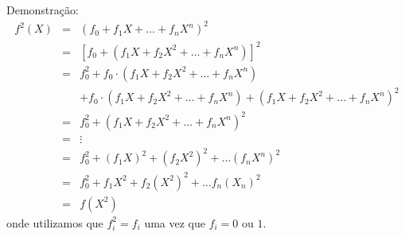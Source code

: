 \begin{frame}[allowframebreaks]
   Demonstração:
   \begin{eqnarray}
     f^2(X) &=& (f_0 + f_1 X + \ldots + f_n X^n)^2 \nonumber\\
            &=& [f_0 + (f_1 X + f_2 X^2 + \ldots + f_n X^n)]^2 \nonumber\\
            &=& f^2_0 + f_0 \cdot (f_1 X + f_2 X^2 + \ldots + f_n X^n) \nonumber\\
             && + f_0 \cdot (f_1 X + f_2 X^2 + \ldots + f_n X^n) + (f_1 X + f_2 X^2 + \ldots + f_n X^n)^2 \nonumber\\
            &=& f^2_0 + (f_1 X + f_2 X^2 + \ldots + f_n X^n)^2 \nonumber\\
            &=& \vdots \nonumber\\
            &=& f^2_0 + (f_1 X)^2 + (f_2 X^2)^2 + \ldots (f_n X^n)^2 \nonumber\\
            &=& f^2_0 + f_1 X^2 + f_2 (X^2)^2 + \ldots f_n (X_n)^2 \nonumber \\
            &=& f(X^2)
   \end{eqnarray}
   onde utilizamos que $f^2_i = f_i$ uma vez que $f_i = 0\text{ ou }1$.

\end{frame}



